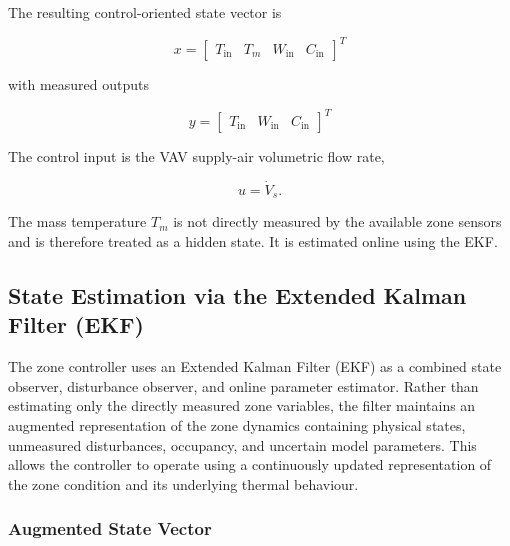 \documentclass[12pt, a4paper]{article}
\begin{document}
	The resulting control-oriented state vector is
	
	\begin{equation}
		x =
		\begin{bmatrix}
			T_{\mathrm{in}} &
			T_m &
			W_{\mathrm{in}} &
			C_{\mathrm{in}}
		\end{bmatrix}^{T}
	\end{equation}
	
	with measured outputs
	
	\begin{equation}
		y =
		\begin{bmatrix}
			T_{\mathrm{in}} &
			W_{\mathrm{in}} &
			C_{\mathrm{in}}
		\end{bmatrix}^{T}
	\end{equation}
	
	The control input is the VAV supply-air volumetric flow rate,
	
	\begin{equation}
		u = \dot{V}_s.
		\label{eq:state_vectors}
	\end{equation}
	
	The mass temperature $T_m$ is not directly measured by the available zone
	sensors and is therefore treated as a hidden state. It is estimated online
	using the EKF.
	
	\newpage
	\subsection{State Estimation via the Extended Kalman Filter (EKF)}
	\label{sec:ekf}

	The zone controller uses an Extended Kalman Filter (EKF) as a combined state observer, disturbance observer, and online parameter estimator. Rather than estimating only the directly measured zone variables, the filter maintains an augmented representation of the zone dynamics containing physical states, unmeasured disturbances, occupancy, and uncertain model parameters. This allows the controller to operate using a continuously updated representation of the zone condition and its underlying thermal behaviour.
	
	\subsubsection{Augmented State Vector}
	
\end{document}
